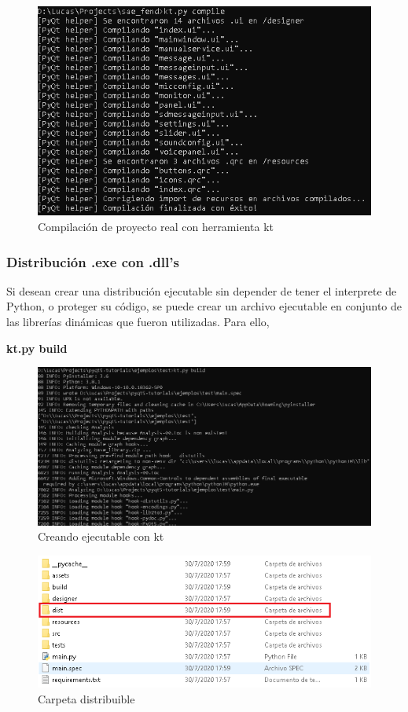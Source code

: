 \begin{figure}[H]
    \centering
    \includegraphics[width=0.9\linewidth]{imagenes/kt/muestra.png}
    \caption{Compilaci\'on de proyecto real con herramienta kt}
    \label{fig:muestra_compilacion_kt}
\end{figure}

\subsubsection{Distribuci\'on .exe con .dll's}
Si desean crear una distribuci\'on ejecutable sin depender de tener el interprete de Python, o proteger su c\'odigo,
se puede crear un archivo ejecutable en conjunto de las librer\'ias din\'amicas que fueron utilizadas. Para ello,

\begin{center}
    \textbf{kt.py build}
\end{center}

\begin{figure}[H]
    \centering
    \includegraphics[width=0.9\linewidth]{imagenes/kt/build.png}
    \caption{Creando ejecutable con kt}
    \label{fig:creacion_ejecutable_kt}
\end{figure}

\begin{figure}[H]
    \centering
    \includegraphics[width=0.9\linewidth]{imagenes/kt/dist.png}
    \caption{Carpeta distribuible}
    \label{fig:carpeta_distribuible_kt}
\end{figure}

